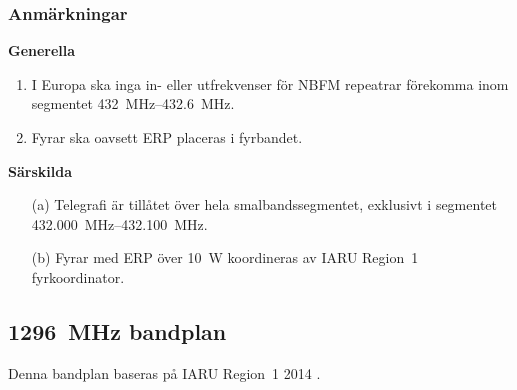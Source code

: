 \subsubsection*{Anmärkningar}

\noindent\textbf{Generella}

\begin{enumerate}[label=\alph*.]
\item I Europa ska inga in- eller utfrekvenser för NBFM repeatrar
förekomma inom segmentet \SIrange{432}{432,6}{\mega\hertz}.
\item Fyrar ska oavsett ERP placeras i fyrbandet.
\end{enumerate}

\noindent\textbf{Särskilda}

\begin{itemize}
\item[(a)] Telegrafi är tillåtet över hela smalbandssegmentet, exklusivt i
segmentet \SIrange{432,000}{432,100}{\mega\hertz}.
\item[(b)] Fyrar med ERP över \qty{10}{\watt} koordineras av IARU Region~1 fyrkoordinator.
\end{itemize}

\newpage

\subsection{\qty{1296}{\mega\hertz} bandplan}
\label{1296MHzbandplan}
Denna bandplan baseras på IARU Region~1 2014 \cite{IARU1}.

